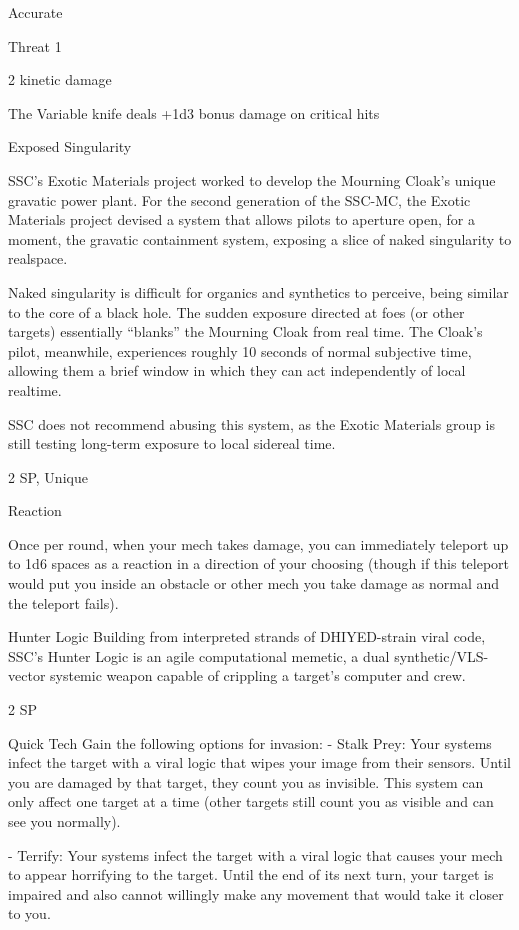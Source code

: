 Accurate

Threat 1

2 kinetic damage

The Variable knife deals +1d3 bonus damage on critical hits

Exposed Singularity




SSC’s Exotic Materials project worked to develop the Mourning Cloak’s unique gravatic power plant. For the
second generation of the SSC-MC, the Exotic Materials project devised a system that allows pilots to
aperture open, for a moment, the gravatic containment system, exposing a slice of naked singularity to
realspace.

Naked singularity is difficult for organics and synthetics to perceive, being similar to the core of a black hole.
The sudden exposure directed at foes (or other targets) essentially “blanks” the Mourning Cloak from real
time. The Cloak’s pilot, meanwhile, experiences roughly 10 seconds of normal subjective time, allowing
them a brief window in which they can act independently of local realtime.

SSC does not recommend abusing this system, as the Exotic Materials group is still testing long-term
exposure to local sidereal time.

2 SP, Unique

Reaction

Once per round, when your mech takes damage, you can immediately teleport up to 1d6 spaces
as a reaction in a direction of your choosing (though if this teleport would put you inside an
obstacle or other mech you take damage as normal and the teleport fails).


Hunter Logic
Building from interpreted strands of DHIYED-strain viral code, SSC’s Hunter Logic is an agile computational
memetic, a dual synthetic/VLS-vector systemic weapon capable of crippling a target’s computer and crew.

2 SP


Quick Tech
Gain the following options for invasion:
         - Stalk Prey: Your systems infect the target with a viral logic that wipes your image from
their sensors. Until you are damaged by that target, they count you as invisible. This system can
only affect one target at a time (other targets still count you as visible and can see you normally).

	        - Terrify: Your systems infect the target with a viral logic that causes your mech to appear
horrifying to the target. Until the end of its next turn, your target is impaired and also cannot
willingly make any movement that would take it closer to you.


